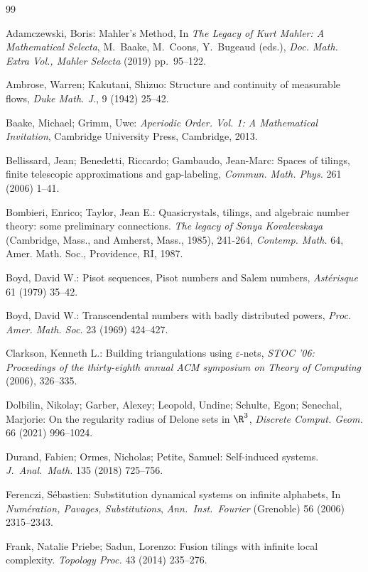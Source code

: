 \begin{thebibliography}{99}



Adamczewski, Boris: Mahler’s Method, In \emph{The Legacy of Kurt Mahler: A Mathematical Selecta}, M.~Baake, M.~Coons, Y.~Bugeaud (eds.), \emph{Doc. Math. Extra Vol., Mahler Selecta} (2019) pp.~95--122.  

Ambrose, Warren; Kakutani, Shizuo: Structure and continuity of measurable flows,  \emph{Duke Math. J.}, 9 (1942) 25–42.


Baake, Michael; Grimm, Uwe: 
\textit{Aperiodic Order. Vol. 1: A Mathematical Invitation},
Cambridge University Press, Cambridge, 2013.

Bellissard, Jean; Benedetti, Riccardo; Gambaudo, Jean-Marc: Spaces of tilings, finite telescopic approximations and gap-labeling, \textit{Commun. Math. Phys.} 261 (2006) 1–41.

Bombieri, Enrico; Taylor, Jean E.:
Quasicrystals, tilings, and algebraic number theory: some preliminary connections. 
\emph{The legacy of Sonya Kovalevskaya} (Cambridge, Mass., and Amherst, Mass., 1985), 
241-264, \emph{Contemp. Math.} 64, Amer. Math. Soc., Providence, RI, 1987.

Boyd, David W.: Pisot sequences, Pisot numbers and Salem numbers, \textit{Ast\'{e}risque} 61 (1979) 35--42.

Boyd, David W.: Transcendental numbers with badly distributed powers, \textit{Proc. Amer. Math. Soc.} 23 (1969) 424--427. 

Clarkson, Kenneth L.: Building triangulations using $\varepsilon$-nets, \emph{STOC '06: Proceedings of the thirty-eighth annual ACM symposium on Theory of Computing} (2006), 326--335.

Dolbilin, Nikolay; Garber, Alexey; Leopold, Undine; Schulte, Egon; Senechal, Marjorie: On the regularity radius of Delone sets in $\R^3$, \emph{Discrete Comput. Geom.} 66 (2021) 996--1024.


Durand, Fabien; Ormes, Nicholas; Petite, Samuel: 
Self-induced systems. 
\emph{J.~Anal.~Math.} 135 (2018) 725--756. 

Ferenczi, Sébastien: 
Substitution dynamical systems on infinite alphabets, In 
\textit{Numération, Pavages, Substitutions}, \emph{Ann.~Inst.~Fourier} (Grenoble) 56 (2006) 2315--2343. 

Frank, Natalie Priebe; Sadun, Lorenzo: 
Fusion tilings with infinite local complexity.
\emph{Topology Proc.} 43 (2014) 235--276.


\end{thebibliography}
